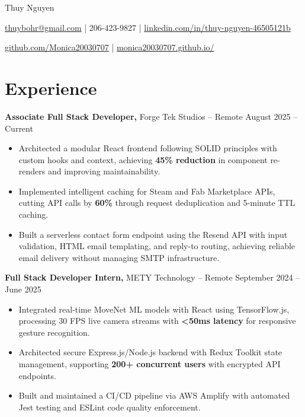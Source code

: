 \documentclass[11pt]{article}
\begin{document}
\centerline{\Huge Thuy Nguyen}

\vspace{5pt}

\centerline{\href{mailto:thuybohr@gmail.com}{thuybohr@gmail.com} | 206-423-9827 |
\href{https://www.linkedin.com/in/thuy-nguyen-46505121b/}{linkedin.com/in/thuy-nguyen-46505121b}}

\centerline{\href{https://github.com/Monica20030707}{github.com/Monica20030707} |
\href{https://monica20030707.github.io/}{monica20030707.github.io/}}

\vspace{-9pt}

\section*{Experience}

\textbf{Associate Full Stack Developer,} {Forge Tek Studios} -- Remote \hfill August 2025 -- Current
\vspace{-9pt}
\begin{itemize}
  \item Architected a modular React frontend following SOLID principles with custom hooks and context, achieving \textbf{45\% reduction} in component re-renders and improving maintainability.
  \item Implemented intelligent caching for Steam and Fab Marketplace APIs, cutting API calls by \textbf{60\%} through request deduplication and 5-minute TTL caching.
  \item Built a serverless contact form endpoint using the Resend API with input validation, HTML email templating, and reply-to routing, achieving reliable email delivery without managing SMTP infrastructure.
\end{itemize}

\textbf{Full Stack Developer Intern,} {METY Technology} -- Remote \hfill September 2024 -- June 2025
\vspace{-9pt}
\begin{itemize}
  \item Integrated real-time MoveNet ML models with React using TensorFlow.js, processing 30 FPS live camera streams with \textbf{<50ms latency} for responsive gesture recognition.
  \item Architected secure Express.js/Node.js backend with Redux Toolkit state management, supporting \textbf{200+ concurrent users} with encrypted API endpoints.
  \item Built and maintained a CI/CD pipeline via AWS Amplify with automated Jest testing and ESLint code quality enforcement.
\end{itemize}
\end{document}
